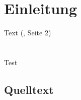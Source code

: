 \chapter{Einleitung}
Text (\cite{Hollosi.2012}, Seite 2)\\\\\\
Test \cite{LloretIvorra.2013}
\section{Quelltext}


